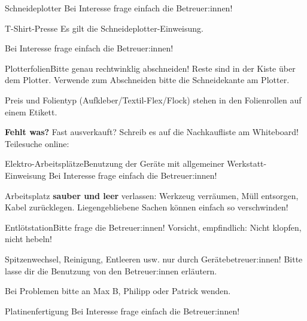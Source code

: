 \begin{schild}[farbe=gelb, einweisung=schneideplotter-einweisung]
	{Schneideplotter}{}
Bei Interesse frage einfach die Betreuer:innen!
\end{schild}

\begin{schild}[farbe=gelb, einweisung=schneideplotter-einweisung, symbole={W017}]
	{T-Shirt-Presse}{}
Es gilt die Schneideplotter-Einweisung.

Bei Interesse frage einfach die Betreuer:innen!
\end{schild}

\begin{schild}[farbe=gruen]
	{Plotterfolien}{Bitte genau rechtwinklig abschneiden!}
Reste sind in der Kiste über dem Plotter.
Verwende zum Abschneiden bitte die Schneidekante am Plotter.

Preis und Folientyp (Aufkleber/Textil-Flex/Flock) stehen in den Folienrollen auf einem Etikett.

\textbf{Fehlt was?} Fast ausverkauft? Schreib es auf die Nachkaufliste am Whiteboard!
Teilesuche online: 
\end{schild}

\begin{schild}[farbe=gruen, einweisung=werkstatt-einweisung]
	{Elektro-Arbeitsplätze}{Benutzung der Geräte mit allgemeiner Werkstatt-Einweisung}
Bei Interesse frage einfach die Betreuer:innen!

Arbeitsplatz \textbf{sauber und leer} verlassen: Werkzeug verräumen, Müll entsorgen,
Kabel zurücklegen. Liegengebliebene Sachen können einfach so verschwinden!
\end{schild}

\begin{schild}[farbe=rot, kontakt={Max B, Philipp, \mail{kontakt@fablab.fau.de}}]
	{Entlötstation}{Bitte frage die Betreuer:innen!}
Vorsicht, empfindlich: Nicht klopfen, nicht hebeln!

Spitzenwechsel, Reinigung, Entleeren usw. nur durch Gerätebetreuer:innen!
Bitte lasse dir die Benutzung von den Betreuer:innen erläutern.

Bei Problemen bitte an Max B, Philipp oder Patrick wenden.
\end{schild}

\begin{schild}[farbe=gelb, einweisung=platinenaetzer-einweisung,
	kontakt={Max, \mail{technik@fablab.fau.de}}, symbole={W023, M004, M009}]
	{Platinenfertigung}{}
Bei Interesse frage einfach die Betreuer:innen!
\end{schild}

